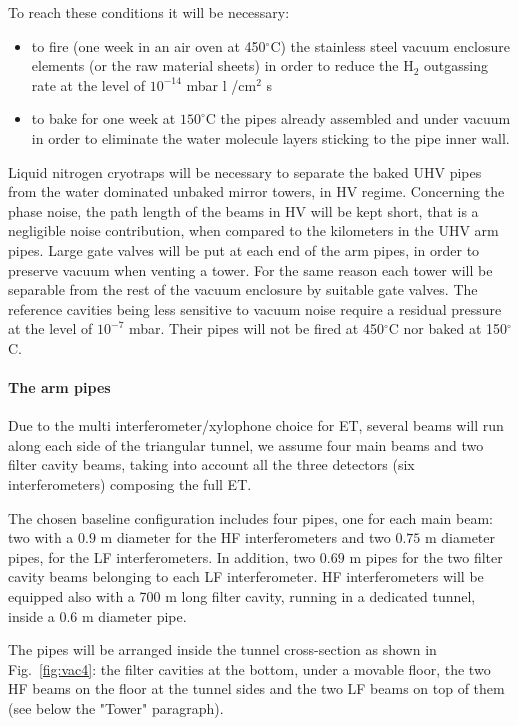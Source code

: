 To reach these conditions it will be necessary:

\begin{itemize}
\item to fire (one week in an air oven at 450$^\circ$C) the stainless steel vacuum enclosure elements (or the raw material sheets) in order to reduce the H$_2$ outgassing rate at the level of $10^{-14}$ mbar l /cm$^{2}$ s
\item to bake for one week at $150^\circ$C the pipes already assembled and under vacuum in order to eliminate the water molecule layers sticking to the pipe inner wall.
\end{itemize}


Liquid nitrogen cryotraps will be necessary to separate the baked UHV pipes from the water dominated unbaked mirror towers, in HV regime. Concerning the phase noise, the path length of the beams in HV will be kept short, that is a negligible noise contribution, when compared to the kilometers in the UHV arm pipes.
Large gate valves will be put at each end of the arm pipes, in order to preserve vacuum when venting a tower. For the same reason each tower will be separable from the rest of the vacuum enclosure by suitable gate valves.
The reference cavities being less sensitive to vacuum noise require a residual pressure at the level of $10^{-7}$ mbar. Their pipes will not be fired at 450$^\circ$C nor baked at 150$^\circ$C.

\paragraph{The arm pipes}

Due to the multi interferometer/xylophone choice for ET, several beams will run along each side of the triangular tunnel, we assume four main beams and two filter cavity beams, taking into account all the three detectors (six interferometers) composing the full ET.

The chosen baseline configuration includes four pipes, one for each main beam: two with a $0.9$ m diameter for the HF interferometers and two $0.75$ m diameter pipes, for the LF interferometers. In addition, two $0.69$ m pipes for the two filter cavity beams belonging to each LF interferometer. HF interferometers will be equipped also with a 700 m long filter cavity, running in a dedicated tunnel, inside a 0.6 m diameter pipe.

The pipes will be arranged inside the tunnel cross-section as shown in Fig.~\ref{fig:vac4}: the filter cavities at the bottom, under a movable floor, the two HF beams on the floor at the tunnel sides and the two LF beams on top of them (see below the "Tower" paragraph).

